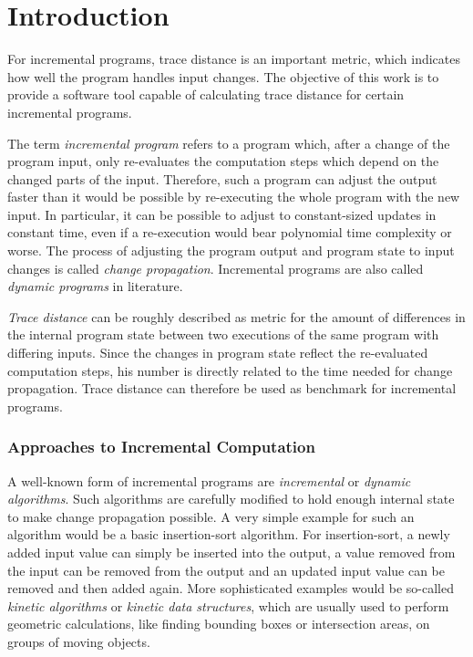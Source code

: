 
\chapter{Introduction}
\label{ch:Introduction}

For incremental programs, trace distance is an important metric, which indicates how well the program handles input changes. The objective of this work is to provide a software tool capable of calculating trace distance for certain incremental programs.  

The term \textit{incremental program} refers to a program which, after a change of the program input, only re-evaluates the computation steps which depend on the changed parts of the input. Therefore, such a program can adjust the output faster than it would be possible by re-executing the whole program with the new input. In particular, it can be possible to adjust to constant-sized updates in constant time, even if a re-execution would bear polynomial time complexity or worse. The process of adjusting the program output and program state to input changes is called \textit{change propagation}. Incremental programs are also called \textit{dynamic programs} in literature. 

\textit{Trace distance} can be roughly described as metric for the amount of differences in the internal program state between two executions of the same program with differing inputs. Since the changes in program state reflect the re-evaluated computation steps, his number is directly related to the time needed for change propagation. Trace distance can therefore be used as benchmark for incremental programs. 

\subsection{Approaches to Incremental Computation}


A well-known form of incremental programs are \textit{incremental} or \textit{dynamic algorithms}. Such algorithms are carefully modified to hold enough internal state to make change propagation possible. A very simple example for such an algorithm would be a basic insertion-sort algorithm. For insertion-sort, a newly added input value can simply be inserted into the output, a value removed from the input can be removed from the output and an updated input value can be removed and then added again. More sophisticated examples would be so-called \textit{kinetic algorithms} or \textit{kinetic data structures}, which are usually used to perform geometric calculations, like finding bounding boxes or intersection areas, on groups of moving objects.

